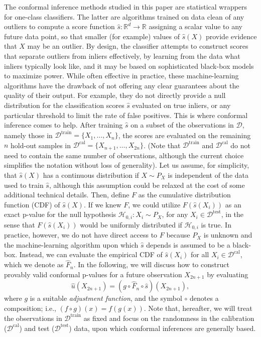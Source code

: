 The conformal inference methods studied in this paper are statistical wrappers for one-class classifiers. The latter are algorithms trained on data clean of any outliers to compute a score function $\hat{s} : \mathbb{R}^d \to \mathbb{R}$ assigning a scalar value to any future data point, so that smaller (for example) values of $\hat{s}(X)$ provide evidence that $X$ may be an outlier. By design, the classifier attempts to construct scores that separate outliers from inliers effectively, by learning from the data what inliers typically look like, and it may be based on sophisticated black-box models to maximize power. While often effective in practice, these machine-learning algorithms have the drawback of not offering any clear guarantees about the quality of their output. For example, they do not directly provide a null distribution for the classification scores $\hat{s}$ evaluated on true inliers, or any particular threshold to limit the rate of false positives.
This is where conformal inference comes to help.
After training $\hat{s}$ on a subset of the observations in $\mathcal{D}$, namely those in $\mathcal{D}^{\text{train}} = \{X_1, \ldots, X_n\}$, the scores are evaluated on the remaining $n$ hold-out samples in $\mathcal{D}^{\text{cal}} = \{X_{n+1}, \ldots, X_{2n}\}$.
(Note that $\mathcal{D}^{\text{train}}$ and $\mathcal{D}^{\text{cal}}$ do not need to contain the same number of observations, although the current choice simplifies the notation without loss of generality).
Let us assume, for simplicity, that $\hat{s}(X)$ has a continuous distribution if $X \sim P_X$ is independent of the data used to train $\hat{s}$, although this assumption could be relaxed at the cost of some additional technical details.
Then, define $F$ as the cumulative distribution function (CDF) of $\hat{s}(X)$.
If we knew $F$, we could utilize $F(\hat{s}(X_i))$ as an exact p-value for the null hypothesis $\mathcal{H}_{0,i}: X_i \sim P_{X}$, for any $X_i \in \mathcal{D}^{\mathrm{test}}$, in the sense that $F(\hat{s}(X_i))$ would be uniformly distributed if $\mathcal{H}_{0,i}$ is true.
In practice, however, we do not have direct access to $F$ because $P_X$ is unknown and the machine-learning algorithm upon which $\hat{s}$ depends is assumed to be a black-box.
Instead, we can evaluate the empirical CDF of $\hat{s}(X_i)$ for all $X_i \in \mathcal{D}^{\text{cal}}$, which we denote as $\hat{F}_n$.
In the following, we will discuss how to construct provably valid conformal p-values for a future observation $X_{2n+1}$ by evaluating
\begin{equation} \label{eq:pval_form}
    \hat{u}(X_{2n+1}) = \left(g \circ \hat{F}_n \circ \hat{s} \right)(X_{2n+1}),
\end{equation}
where $g$ is a suitable \emph{adjustment function}, and the symbol $\circ$ denotes a composition; i.e., $(f \circ g)(x) = f(g(x))$.
Note that, hereafter, we will treat the observations in $\mathcal{D}^{\text{train}}$ as fixed and focus on the randomness in the calibration ($\mathcal{D}^{\text{cal}}$) and test ($\mathcal{D}^{\mathrm{test}}$) data, upon which conformal inferences are generally based.


